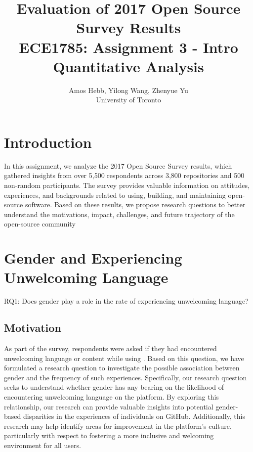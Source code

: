 \documentclass[journal,12pt,onecolumn,]{IEEEtran}
\begin{document}
\title{Evaluation of 2017 Open Source Survey Results \\
{\normalsize ECE1785: Assignment 3 - Intro Quantitative Analysis}}

\author{Amos Hebb, Yilong Wang, Zhenyue Yu\\ \small University of Toronto}

\maketitle

\section{Introduction}

In this assignment, we analyze the  2017 Open Source Survey results,
which gathered insights from over 5,500 respondents across 3,800 repositories and 500 non-random participants.
The survey provides valuable information on attitudes, experiences, and backgrounds related to using, building,
and maintaining open-source software. Based on these results,
we propose research questions to better understand the motivations, impact, challenges, and future trajectory of the open-source community

\section{Gender and Experiencing Unwelcoming Language}

RQ1: Does gender play a role in the rate of experiencing unwelcoming language?

\subsection{Motivation}

As part of the survey, respondents were asked if they had encountered unwelcoming language or content while using .
Based on this question, we have formulated a research question to investigate the possible association between gender and the frequency of such experiences.
Specifically, our research question seeks to understand whether gender has any bearing on the likelihood of encountering unwelcoming language on the platform.
By exploring this relationship, our research can provide valuable insights into potential gender-based disparities in the experiences of individuals on GitHub.
Additionally, this research may help identify areas for improvement in the platform's culture, particularly with respect to fostering a more inclusive and welcoming environment for all users.
\end{document}
